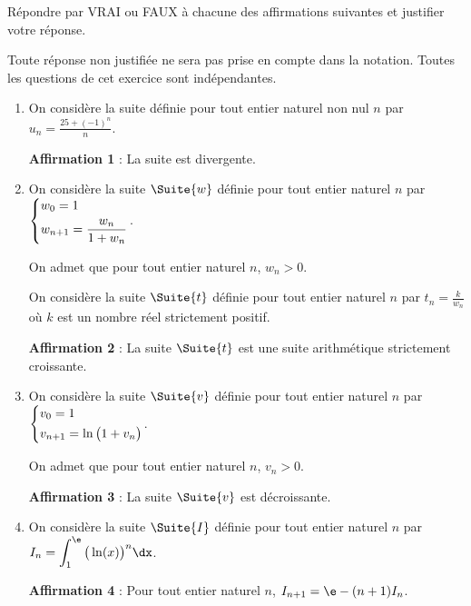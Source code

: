 Répondre par VRAI ou FAUX à chacune des affirmations suivantes et justifier votre réponse.

Toute réponse non justifiée ne sera pas prise en compte dans la notation. Toutes les questions de cet exercice sont indépendantes.

\smallskip

\begin{enumerate}
	\item On considère la suite  définie pour tout entier naturel non nul $n$ par $u_n = \frac{25+(-1)^n}{n}$.
	
	\medskip
	
	\textbf{Affirmation 1} : La suite  est divergente.
	\item On considère la suite $\Suite{w}$ définie pour tout entier naturel $n$ par $\begin{dcases} w_0 = 1 \\ w_{n+1}=\frac{w_n}{1+w_n} \end{dcases}$.
	
	On admet que pour tout entier naturel $n$, $w_n > 0$.
	
	On considère la suite $\Suite{t}$ définie pour tout entier naturel $n$ par $t_n = \frac{k}{w_n}$ où $k$ est un nombre réel strictement positif.
	
	\medskip
	
	\textbf{Affirmation 2} : La suite $\Suite{t}$ est une suite arithmétique strictement croissante.
	\item On considère la suite $\Suite{v}$ définie pour tout entier naturel $n$ par $\begin{dcases} v_0 = 1 \\ v_{n+1}=\ln\big(1+v_n\big) \end{dcases}$.
	
	On admet que pour tout entier naturel $n$, $v_n > 0$.
	
	\medskip
	
	\textbf{Affirmation 3} : La suite $\Suite{v}$ est décroissante.
	\item On considère la suite $\Suite{I}$ définie pour tout entier naturel $n$ par $I_n = \displaystyle\int_1^{\e} {\big(\ln(x)\big)}^n \dx$.
	
	\medskip
	
	\textbf{Affirmation 4} : Pour tout entier naturel $n$, $I_{n+1} = \e-(n+1)I_n$.
\end{enumerate}